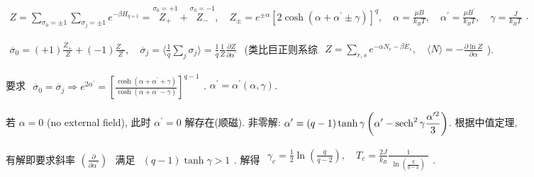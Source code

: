 \documentclass[../../main.tex]{subfiles}
\begin{document}
$\begin{aligned}
    Z = \sum_{\sigma_{0}=\pm 1}\sum_{\sigma_{j}=\pm 1}e^{-\beta H_{q+1}} = \stackrel{\sigma_{0}=+1}{Z_{+}} + \stackrel{\sigma_{0}=-1}{Z_{-}},\quad Z_{\pm} = e^{\pm \alpha}\left[2\cosh{\left(\alpha+\alpha^{\prime}\pm\gamma\right)}\right]^{q},\quad 
    \alpha = \frac{\mu B}{k_{B}T},\quad \alpha^{\prime} = \frac{\mu B^{\prime}}{k_{B}T},\quad \gamma = \frac{J}{k_{B}T}
\end{aligned}$.

$\begin{aligned}
    \overline{\sigma}_{0} = (+1)\frac{Z_{+}}{Z} + (-1)\frac{Z_{-}}{Z} ,\quad \overline{\sigma}_{j} = \langle \frac{1}{q}\sum_{j}\sigma_{j}\rangle = \frac{1}{q}\frac{1}{Z} \frac{\partial Z}{\partial\alpha^{\prime}}
\end{aligned}$ (类比巨正则系综 $\begin{aligned}
    Z = \sum_{r,s}e^{-\alpha N_{r}-\beta E_{s}},\quad \langle N\rangle = -\frac{\partial\ln{Z}}{\partial\alpha}
\end{aligned}$).

要求 $\begin{aligned}
    \overline{\sigma}_{0} = \overline{\sigma}_{j}\Rightarrow e^{2\alpha^{\prime}} = \left[
        \frac{\cosh{(\alpha+\alpha^{\prime}+\gamma)}}{\cosh{(\alpha+\alpha^{\prime}-\gamma)}}
    \right]^{q-1}
\end{aligned}$. $\alpha^{\prime} = \alpha^{\prime}(\alpha,\gamma)$. 

若 $\alpha = 0$ (no external field), 此时 $\alpha^{\prime} = 0$ 解存在(顺磁). 非零解: $\begin{aligned}
    \alpha^{\prime} = (q-1)\tanh{\gamma} \left(\alpha^{\prime}-\operatorname{sech}^{2}{\gamma}\frac{\alpha^{\prime 2}}{3}\right)
\end{aligned}$. 根据中值定理, 

有解即要求斜率$\begin{aligned}
    \left(\frac{\partial}{\partial\alpha^{\prime}}\right)
\end{aligned}$ 满足 $\begin{aligned}(q-1)\tanh{\gamma}>1
\end{aligned}$. 解得 $\begin{aligned}
    \gamma_{c} = \frac{1}{2}\ln{\left(\frac{q}{q-2}\right)},\quad T_{c} = \frac{2J}{k_{B}}\frac{1}{\begin{aligned}
        \ln{\left(\frac{q}{q-2}\right)}
    \end{aligned}}
\end{aligned}$. 
\end{document}
